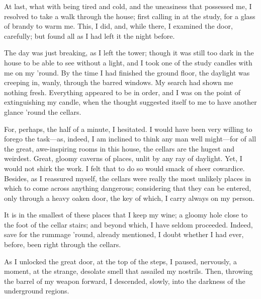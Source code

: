 
\clearpage
\label{ch:05}

\begin{ChapterStart}
\null\null
{}
\end{ChapterStart}


At last, what with being tired and cold, and the uneasiness that possessed me, I resolved to take a walk through the house; first calling in at the study, for a glass of brandy to warm me. This, I did, and, while there, I examined the door, carefully; but found all as I had left it the night before.

The day was just breaking, as I left the tower; though it was still too dark in the house to be able to see without a light, and I took one of the study candles with me on my ’round. By the time I had finished the ground floor, the daylight was creeping in, wanly, through the barred windows. My search had shown me nothing fresh. Everything appeared to be in order, and I was on the point of extinguishing my candle, when the thought suggested itself to me to have another glance ’round the cellars.

For, perhaps, the half of a minute, I hesitated. I would have been very willing to forego the task---as, indeed, I am inclined to think any man well might---for of all the great, awe-inspiring rooms in this house, the cellars are the hugest and weirdest. Great, gloomy caverns of places, unlit by any ray of daylight. Yet, I would not shirk the work. I felt that to do so would smack of sheer cowardice. Besides, as I reassured myself, the cellars were really the most unlikely places in which to come across anything dangerous; considering that they can be entered, only through a heavy oaken door, the key of which, I carry always on my person.

It is in the smallest of these places that I keep my wine; a gloomy hole close to the foot of the cellar stairs; and beyond which, I have seldom proceeded. Indeed, save for the rummage ’round, already mentioned, I doubt whether I had ever, before, been right through the cellars.

As I unlocked the great door, at the top of the steps, I paused, nervously, a moment, at the strange, desolate smell that assailed my nostrils. Then, throwing the barrel of my weapon forward, I descended, slowly, into the darkness of the underground regions.

